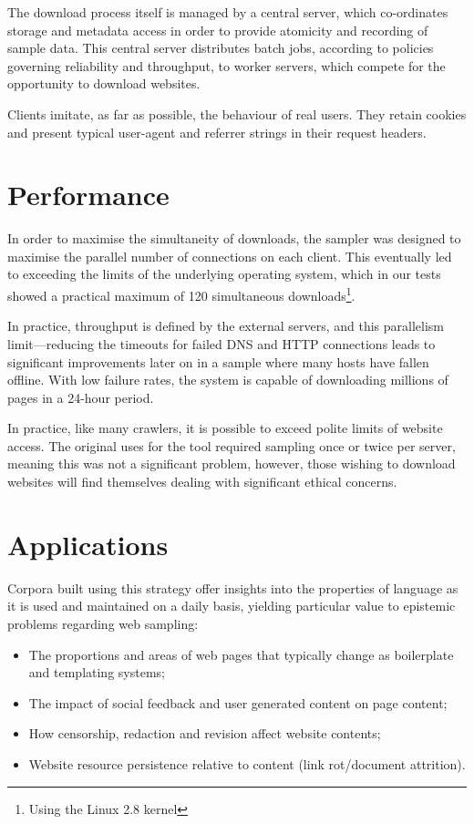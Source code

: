 \documentclass[11pt]{article}
\begin{document}
The download process itself is managed by a central server, which co-ordinates storage and metadata access in order to provide atomicity and recording of sample data.  This central server distributes batch jobs, according to policies governing reliability and throughput, to worker servers, which compete for the opportunity to download websites.

Clients imitate, as far as possible, the behaviour of real users.  They retain cookies and present typical user-agent and referrer strings in their request headers.

\section{Performance}
In order to maximise the simultaneity of downloads, the sampler was designed to maximise the parallel number of connections on each client.  This eventually led to exceeding the limits of the underlying operating system, which in our tests showed a practical maximum of 120 simultaneous downloads\footnote{Using the Linux 2.8 kernel}.

In practice, throughput is defined by the external servers, and this parallelism limit---reducing the timeouts for failed DNS and HTTP connections leads to significant improvements later on in a sample where many hosts have fallen offline.  With low failure rates, the system is capable of downloading millions of pages in a 24-hour period.

In practice, like many crawlers, it is possible to exceed polite limits of website access.  The original uses for the tool required sampling once or twice per server, meaning this was not a significant problem, however, those wishing to download websites will find themselves dealing with significant ethical concerns.

\section{Applications}

Corpora built using this strategy offer insights into the properties of language as it is used and maintained on a daily basis, yielding particular value to epistemic problems regarding web sampling:

\begin{itemize}
    \item The proportions and areas of web pages that typically change as boilerplate and templating systems;
    \item The impact of social feedback and user generated content on page content;
    \item How censorship, redaction and revision affect website contents;
    \item Website resource persistence relative to content (link rot/document attrition).
\end{itemize}





\end{document}
